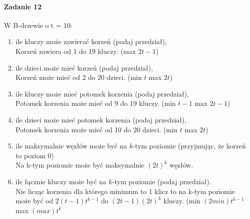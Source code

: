 \documentclass[18pt]{extarticle}
\begin{document}
\paragraph{Zadanie 12} W B-drzewie o t = 10:
\begin{enumerate}[label=(\alph*)]
    \item ile kluczy może zawierać korzeń (podaj przedział), \\
    Korzeń zawiera od 1 do 19 kluczy. (max $2t-1$)
    \item ile dzieci może mieć korzeń (podaj przedział), \\
    Korzeń może mieć od 2 do 20 dzieci. (min $t$ max $2t$)
    \item ile kluczy może mieć potomek korzenia (podaj przedział), \\
    Potomek korzenia może mieć od 9 do 19 kluczy. (min $t-1$ max $2t-1$)
    \item ile dzieci może mieć potomek korzenia (podaj przedział), \\
    Potomek korzenia może mieć od 10 do 20 dzieci. (min $t$ max $2t$)
    \item ile maksymalnie węzłów może być na $k$-tym poziomie (przyjmując, że korzeń to poziom $0$) \\
    Na k-tym poziomie może być maksymalnie $(2t)^k$ węzłów.
    \item ile łącznie kluczy może być na $k$-tym poziomie (podaj przedział). \\
    Nie licząc korzenia dla którego minimum to 1 klicz to na k-tym poziomie może być od $2(t-1)t^{k-1}$ do $(2t-1)(2t)^{k}$ kluczy. (min $(2min)t^{k-1}$ max $(max)t^{k}$
\end{enumerate}
\end{document}
